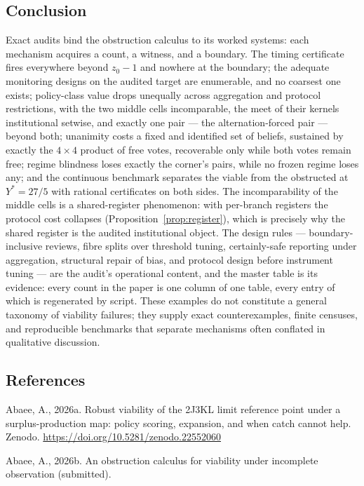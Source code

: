 \documentclass[10pt,twocolumn]{article}
\theoremstyle{definition}
\begin{document}
\subsection{Conclusion}\label{conclusion}

Exact audits bind the obstruction calculus to its worked systems: each
mechanism acquires a count, a witness, and a boundary. The timing
certificate fires everywhere beyond \(z_0 - 1\) and nowhere at the
boundary; the adequate monitoring designs on the audited target are
enumerable, and no coarsest one exists; policy-class value drops
unequally across aggregation and protocol restrictions, with the two
middle cells incomparable, the meet of their kernels institutional
setwise, and exactly one pair --- the alternation-forced pair --- beyond
both; unanimity costs a fixed and identified set of beliefs, sustained
by exactly the \(4 \times 4\) product of free votes, recoverable only
while both votes remain free; regime blindness loses exactly the
corner's pairs, while no frozen regime loses any; and the continuous
benchmark separates the viable from
the obstructed at \(Y^{*} = 27/5\) with rational certificates on both
sides. The incomparability of the middle cells is a shared-register
phenomenon: with per-branch registers the protocol cost collapses
(Proposition~\ref{prop:register}), which is precisely why the shared
register is the audited institutional object. The design rules --- boundary-inclusive reviews, fibre splits
over threshold tuning, certainly-safe reporting under aggregation,
structural repair of bias, and protocol design before instrument tuning
--- are the audit's operational content, and the master table is its
evidence: every count in the paper is one column of one table, every entry of which is regenerated by script. These examples do not constitute a general taxonomy of viability failures; they supply exact counterexamples, finite censuses, and reproducible benchmarks that separate mechanisms often conflated in qualitative discussion.

\subsection*{References}

Abaee, A., 2026a. Robust viability of the 2J3KL limit reference point
under a surplus-production map: policy scoring, expansion, and when
catch cannot help. Zenodo.
\url{https://doi.org/10.5281/zenodo.22552060}

Abaee, A., 2026b. An obstruction calculus for viability under
incomplete observation (submitted).
\end{document}
